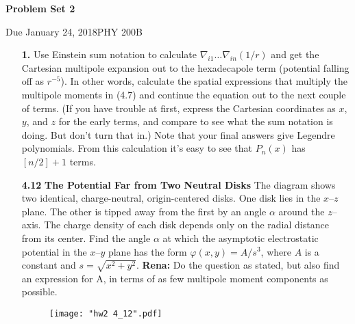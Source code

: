 \documentclass{article}
\newcommand{\Title}     {Problem Set 2}
\newcommand{\DueDate}   {January 24, 2018}
\newcommand{\Course}    {PHY 200B}
\begin{document}
{\huge\textbf{\Title}}

Due \DueDate \hfill \Course

\hrulefill

\begin{enumerate}
    \item [\textbf{1.}] Use Einstein sum notation to calculate $\nabla_{i1}\ldots\nabla_{in}(1/r)$ and get the Cartesian multipole expansion out to the hexadecapole term (potential falling off as $r^{-5}$). In other words, calculate the spatial expressions that multiply the multipole moments in (4.7) and continue the equation out to the next couple of terms. (If you have trouble at first, express the Cartesian coordinates as $x$, $y$, and $z$ for the early terms, and compare to see what the sum notation is doing. But don't turn that in.) Note that your final answers give Legendre polynomials. From this calculation it's easy to see that $P_n(x)$ has $[n/2]+1$ terms.

    \item [\textbf{4.12}] \textbf{The Potential Far from Two Neutral Disks } The diagram shows two identical, charge-neutral, origin-centered disks. One disk lies in the $x$--$z$ plane. The other is tipped away from the first by an angle $\alpha$ around the $z$--axis. The charge density of each disk depends only on the radial distance from its center. Find the angle $\alpha$ at which the asymptotic electrostatic potential in the $x$--$y$ plane has the form $\varphi(x,y) = A/s^3$, where $A$ is a constant and $s=\sqrt{x^2+y^2}$. \textbf{Rena:} Do the question as stated, but also find an expression for A, in terms of as few multipole moment components as possible.
    \begin{figure}[H]
    \centering
    \texttt{[image: "hw2 4\_12".pdf]}
    \end{figure}


\end{enumerate}
\end{document}
